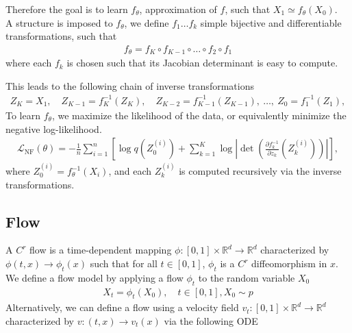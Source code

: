 \documentclass{article}
\begin{document}
Therefore the goal is to learn \(f_\theta\), approximation of \(f\), such that \(X_1 \simeq f_\theta(X_0)\). \\
A structure is imposed to $f_\theta$, we define $f_1\ldots f_k$ simple bijective and differentiable transformations,  such that
\begin{align}
    f_\theta = f_K\circ f_{K-1}\circ\ldots\circ f_2\circ f_1
\end{align}
where each \( f_k \) is chosen such that its Jacobian determinant is easy to compute.

\begin{comment}
There is then, 
\begin{align}
    X_0\sim p_0=q, \quad f_1(X_0) = X_1 \implies X_1\sim p_1,\quad f(X_1)=X_2 \ldots f(X_{k-1})=X_k \sim p_k = \hat{p} \simeq p
\end{align}
\end{comment}
This leads to the following chain of inverse transformations
\begin{align}
    Z_K = X_1,\quad Z_{K-1} = f_K^{-1}(Z_K),\quad Z_{K-2} = f_{K-1}^{-1}(Z_{K-1}),\ \dots,\ Z_0 = f_1^{-1}(Z_1),
\end{align}
To learn \(f_\theta\), we maximize the likelihood of the data, or equivalently minimize the negative log-likelihood.
\begin{align}
    \mathcal{L}_\text{NF}(\theta) 
    = -\frac{1}{n} \sum_{i=1}^n \left[ \log q(Z_0^{(i)}) + \sum_{k=1}^K \log \left| \det \left( \frac{\partial f_k^{-1}}{\partial z_{k}}(Z_k^{(i)}) \right) \right| \right],
\end{align}
where \( Z_0^{(i)} = f_\theta^{-1}(X_i) \), and each \( Z_k^{(i)} \) is computed recursively via the inverse transformations.


\subsection{Flow}
A $C^r$ flow is a time-dependent mapping $\phi : [0,1]\times \mathbb{R}^d\rightarrow\mathbb{R}^d$ characterized by $\phi(t,x) \rightarrow \phi_t(x)$ such that for all $t\in[0,1]$, $\phi_t$ is a $C^r$ diffeomorphism in $x$.
We define a flow model by applying a flow $\phi_t$ to the random variable $X_0$
\begin{align}\label{flow-model}
    X_t=\phi_t(X_0), \quad t \in[0,1], X_0\sim p 
\end{align}
Alternatively, we can define a flow using a velocity field \(v_t:[0,1]\times\mathbb{R}^d\rightarrow \mathbb{R}^d\) characterized by \(v:(t,x)\rightarrow v_t(x)\) via the following ODE 
\end{document}
